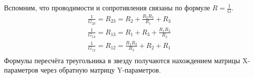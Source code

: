 \documentclass[11pt,a4paper]{article}
\begin{document}
Вспомним, что проводимости и сопротивления связаны по формуле $R = \frac{1}{G}$.
$$
\begin{array}{l}
\frac{1}{G_{23}} = R_{23} = R_2 + \frac{R_2R_3}{R_1} + R_3 \\
\frac{1}{G_{13}} = R_{13} = R_1 + R_3 + \frac{R_1R_3}{R_2} \\
\frac{1}{G_{12}} = R_{12} = \frac{R_1R_2}{R_3} + R_2 + R_1 \\
\end{array}
$$
Формулы пересчёта треугольника в звезду получаются нахождением матрицы X-параметров через обратную 
матрицу Y-параметров.
\end{document}
